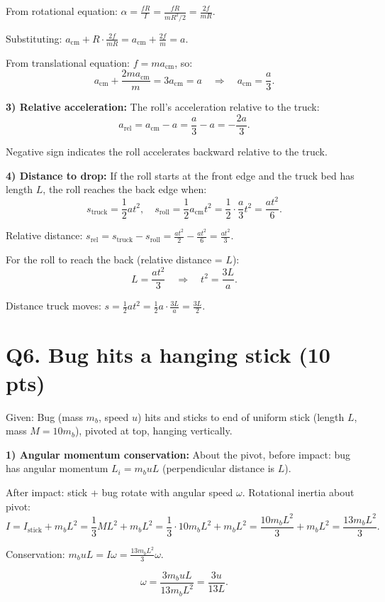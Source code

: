 \documentclass[11pt]{article}
\newcommand{\ans}[1]{\boxed{\displaystyle #1}}
\begin{document}
From rotational equation: $\alpha = \frac{fR}{I} = \frac{fR}{mR^2/2} = \frac{2f}{mR}$.

Substituting: $a_{\text{cm}} + R \cdot \frac{2f}{mR} = a_{\text{cm}} + \frac{2f}{m} = a$.

From translational equation: $f = ma_{\text{cm}}$, so:
\[ a_{\text{cm}} + \frac{2ma_{\text{cm}}}{m} = 3a_{\text{cm}} = a \quad\Rightarrow\quad a_{\text{cm}} = \ans{\frac{a}{3}}. \]

\textbf{3) Relative acceleration:} The roll's acceleration relative to the truck:
\[ a_{\text{rel}} = a_{\text{cm}} - a = \frac{a}{3} - a = \ans{-\frac{2a}{3}}. \]

Negative sign indicates the roll accelerates backward relative to the truck.

\textbf{4) Distance to drop:} If the roll starts at the front edge and the truck bed has length $L$, the roll reaches the back edge when:
\[ s_{\text{truck}} = \frac{1}{2}at^2, \quad s_{\text{roll}} = \frac{1}{2}a_{\text{cm}}t^2 = \frac{1}{2} \cdot \frac{a}{3}t^2 = \frac{at^2}{6}. \]

Relative distance: $s_{\text{rel}} = s_{\text{truck}} - s_{\text{roll}} = \frac{at^2}{2} - \frac{at^2}{6} = \frac{at^2}{3}$.

For the roll to reach the back (relative distance = $L$):
\[ L = \frac{at^2}{3} \quad\Rightarrow\quad t^2 = \frac{3L}{a}. \]

Distance truck moves: $s = \frac{1}{2}at^2 = \frac{1}{2}a \cdot \frac{3L}{a} = \ans{\frac{3L}{2}}$.

\section*{Q6. Bug hits a hanging stick (10 pts)}
Given: Bug (mass $m_b$, speed $u$) hits and sticks to end of uniform stick (length $L$, mass $M = 10m_b$), pivoted at top, hanging vertically.

\textbf{1) Angular momentum conservation:} About the pivot, before impact: bug has angular momentum $L_i = m_b u L$ (perpendicular distance is $L$).

After impact: stick + bug rotate with angular speed $\omega$. Rotational inertia about pivot:
\[ I = I_{\text{stick}} + m_b L^2 = \frac{1}{3}ML^2 + m_b L^2 = \frac{1}{3} \cdot 10m_b L^2 + m_b L^2 = \frac{10m_b L^2}{3} + m_b L^2 = \frac{13m_b L^2}{3}. \]

Conservation: $m_b u L = I\omega = \frac{13m_b L^2}{3}\omega$.

\[ \omega = \frac{3m_b u L}{13m_b L^2} = \ans{\frac{3u}{13L}}. \]
\end{document}
